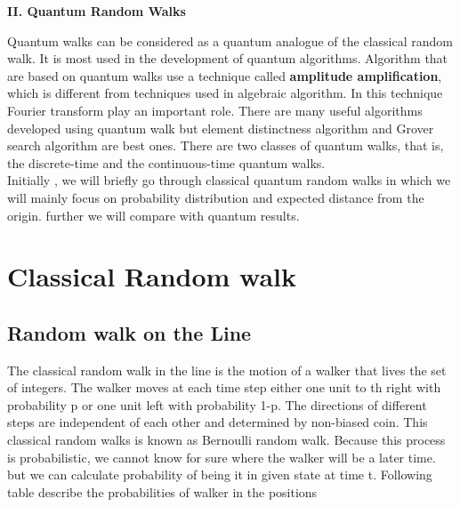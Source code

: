 \documentclass[11 pt]{article}
\theoremstyle{definition}
\theoremstyle{remark}
\begin{document}
\newpage
\begin{center}
\begin{LARGE}
\textbf{II. Quantum Random Walks}
\end{LARGE}
\end{center}

Quantum walks can be considered as a quantum analogue of the classical random walk. It is most used in the development of quantum algorithms. Algorithm that are based on quantum walks use a technique called \textbf{amplitude amplification}, which is different from techniques used in algebraic algorithm. In this technique Fourier transform play an important role. There are many useful algorithms developed using quantum walk but element distinctness algorithm and Grover search algorithm are best ones. There are two classes of quantum walks, that is, the discrete-time and the continuous-time quantum walks.\\

Initially , we will briefly go through classical quantum random walks in which we will mainly focus on probability distribution and expected distance from the origin. further we will compare with quantum results. 

\section{Classical Random walk}
\subsection{Random walk on the Line}
The classical random walk in the line is the motion of a walker that lives the set of integers. The walker moves at each time step either one unit to th right with probability p or one unit left with probability 1-p. The directions of different steps are independent of each other and determined by non-biased coin. This classical random walks is known as Bernoulli random walk. Because this process is probabilistic, we cannot know for sure where the walker will be a later time. but we can calculate probability of being it in given state at time t. Following table describe the probabilities of walker in the positions 
\end{document}
